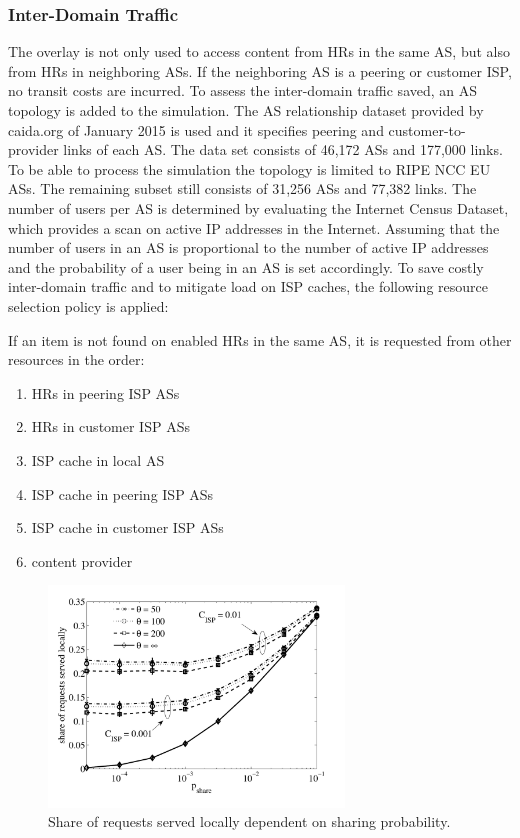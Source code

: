 \subsubsection{Inter-Domain Traffic}

The overlay is not only used to access content from HRs in the same AS, but also from HRs in neighboring ASs. If the neighboring AS is a peering or customer ISP, no transit costs are incurred.
To assess the inter-domain traffic saved, an AS topology is added to the simulation. The AS relationship dataset provided by caida.org\cite{caida2015} of January 2015 is used and it specifies peering and customer-to-provider links of each AS. The data set consists of 46,172 ASs and 177,000 links.
To be able to process the simulation the topology is limited to RIPE NCC EU ASs. The remaining subset still consists of 31,256 ASs and 77,382 links.
The number of users per AS is determined by evaluating the Internet Census Dataset\cite{carna2013}, which provides a scan on active IP addresses in the Internet. Assuming that the number of users in an AS is proportional to the number of active IP addresses and the probability of a user being in an AS is set accordingly.
To save costly inter-domain traffic and to mitigate load on ISP caches, the following resource selection policy is applied:

If an item is not found on enabled HRs in the same AS, it is requested from other resources in the order:
\begin{enumerate}
	\itemsep0em
	\item HRs in peering ISP ASs
	\item HRs in customer ISP ASs
	\item ISP cache in local AS
	\item ISP cache in peering ISP ASs
	\item ISP cache in customer ISP ASs
	\item content provider
\end{enumerate}

\begin{figure}[tb]
  \centering
  \includegraphics[width=0.7\textwidth]{hierarchical/simulative/figures/RBHlocal}
  \caption{Share of requests served locally dependent on sharing probability.}
  \label{fig:RBHlocal}
\end{figure}

